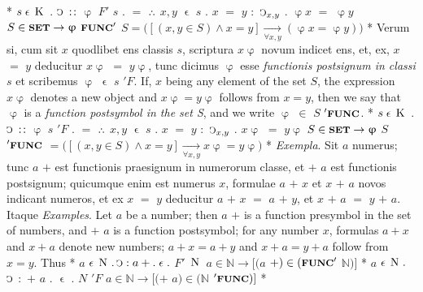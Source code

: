 \documentclass{book}
\newcommand{\C}{\mathop{\sbox0{$\displaystyle$$\reflectbox{C}$} %
\raisebox{-\height+\ht0-0.05cm}[\ht0][\dp0]{\scalebox{0.8}[0.8]{\copy0}}}\displaylimits} %
\newcommand{\pppNoSpace}{\leavevmode\lower0ex\hbox{.}\kern-0.1em\raise0.7ex\hbox{.}\kern-0.1em\lower0ex\hbox{.}} %
\newcommand{\smallIn}{\ensuremath{\mathrel{\epsilon}}}
\newcommand{\K}{\mathop{\thinspace \text{K} \thinspace}}
\newcommand{\N}{\mathop{\thinspace \text{N} \thinspace}}
\newcommand{\setOfSets}{\mathord{\text{{\footnotesize \textbf{SET}}}}}
\newcommand{\func}{\mathord{\text{{\footnotesize \textbf{FUNC}}}}}
\newenvironment{translateTwoCol}
               { %
                 \columnratio{0.5, 0.5}
                 \begin{paracol}{2}
                 \newcommand{\LAT}{\switchcolumn[0]*}
                 \newcommand{\ENG}{\switchcolumn[1]}
               }
               { %
                 \let\ENG\undefined
                 \let\LAT\undefined
                 \end{paracol}
               }
\begin{document}
\begin{translateTwoCol}
\LAT
\hspace{1.06cm} $s \smallIn \K$ $.$ $\C$ $:\hspace{0.1em}:$ $\upvarphi$ $F'$ $s$ $.$ $=$ $\pppNoSpace$ $x,y$ $\smallIn$ $s$ $.$ $x$ $=$ $y$ $:$ $\C_{x,y}$ $.$ $\upvarphi x$ $=$ $\upvarphi y$
\ENG
\hspace{1.06cm} $S \in \setOfSets \rightarrow \upvarphi$ $\func'$ $S = \Big( [(x,y \in S) \wedge x = y] \xrightarrow[\forall x,y]{} ( \upvarphi x = \upvarphi y) \Big)$
\LAT
Verum si, cum sit $x$ quodlibet ens classis $s$, scriptura $x\upvarphi$ novum indicet ens, et, ex, $x$ $=$ $y$ deducitur $x\upvarphi$ $=$ $y\upvarphi$, tunc dicimus $\upvarphi$ esse \emph{functionis postsignum in classi} $s$ et scribemus $\upvarphi$ $\smallIn$ $s$ $'F$.
\ENG
If, $x$ being any element of the set $S$, the expression $x\upvarphi$ denotes a new object and $x\upvarphi = y\upvarphi$ follows from $x=y$, then we say that $\upvarphi$ is a \emph{function postsymbol in the set S}, and we write $\upvarphi$ $\in$ $S$ $'\func$.
\LAT
\hspace{1.06cm} $s \smallIn \K$ $.$ $\C$ $:\hspace{0.1em}:$ $\upvarphi$ $s$ $'F$ $.$ $=$ $\pppNoSpace$ $x,y$ $\smallIn$ $s$ $.$ $x$ $=$ $y$ $:$ $\C_{x,y}$ $.$ $x\upvarphi$ $=$ $y\upvarphi$
\ENG
\hspace{1.06cm} $S \in \setOfSets \rightarrow \upvarphi$ $S$ $'\func$ $= \Big( [(x,y \in S) \wedge x=y] \xrightarrow[\forall x,y]{} x\upvarphi=y\upvarphi \Big)$
\LAT
\emph{Exempla}. Sit $a$ numerus; tunc $a$ $+$ est functionis praesignum in numerorum classe, et $+$ $a$ est functionis postsignum; quicumque enim est numerus $x$, formulae $a$ $+$ $x$ et $x$ $+$ $a$ novos indicant numeros, et ex $x$ $=$ $y$ deducitur $a$ $+$ $x$ $=$ $a$ $+$ $y$, et $x$ $+$ $a$ $=$ $y$ $+$ $a$. Itaque
\ENG
\emph{Examples}. Let $a$ be a number; then $a$ $+$ is a function presymbol in the set of numbers, and $+$ $a$ is a function postsymbol; for any number $x$, formulas $a+x$ and $x+a$ denote new numbers; $a+x=a+y$ and $x+a=y+a$ follow from $x=y$. Thus 
\LAT
\hspace{1.06cm} $a$ $\smallIn \N . \C : a + . \smallIn .$ $F'$ $\N$
\ENG
\hspace{1.06cm} $a \in \mathbb{N} \rightarrow [(a$ $+) \in (\func'$ $\mathbb{N})]$
\LAT
\hspace{1.06cm} $a$ $\smallIn \N .$ $\C$ $:$ $+$ $a$ $.$ $\smallIn$ $.$ $N$ $'F$
\ENG
\hspace{1.06cm} $a \in \mathbb{N} \rightarrow [(+$ $a) \in (\mathbb{N}$ $'\func)]$
\LAT
\hfill
\ENG

\end{translateTwoCol}
\end{document}
